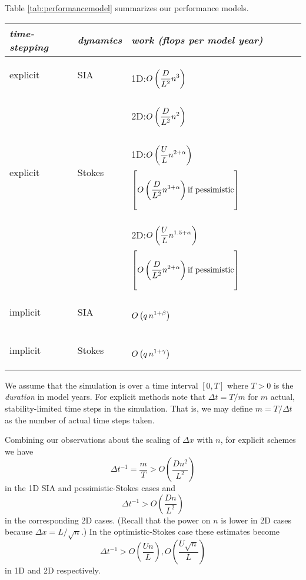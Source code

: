 \documentclass[twocolumn,letterpaper]{igs}
\begin{document}
Table \ref{tab:performancemodel} summarizes our performance models.

\newcommand{\oo}[1]{{\LARGE \strut} \displaystyle O\left(#1\right)}
\setlength{\tabcolsep}{5pt}
\renewcommand{\arraystretch}{1.5}
\begin{table*}[ht]
\begin{tabular}{lll}
\emph{time-stepping} & \emph{dynamics} & \emph{work (flops per model year)} \\ \hline
explicit & SIA    & 1D:\quad $\oo{\frac{D}{L^2} n^3}$ \\
         &        & 2D:\quad $\oo{\frac{D}{L^2} n^2}$ \\
explicit & Stokes & 1D:\quad $\oo{\frac{U}{L} n^{2+\alpha}}$ \quad $\left[\oo{\frac{D}{L^2} n^{3+\alpha}} \text{if pessimistic}\right]$ \\
         &        & 2D:\quad $\oo{\frac{U}{L} n^{1.5+\alpha}}$ \quad $\left[\oo{\frac{D}{L^2} n^{2+\alpha}} \text{if pessimistic}\right]$ \\
implicit & SIA    & $\oo{q\, n^{1+\beta}}$ \\
implicit & Stokes & $\oo{q\, n^{1+\gamma}}$
\end{tabular}
\caption{Asymptotic scaling of computational work for time-stepping numerical ice sheet simulations as the degrees of freedom $n$ goes to infinity (high horizontal resolution).  Note 1D and 2D refer to flow-line and map-plane simulations, respectively.  See Table \ref{tab:notation} for remaining notation.}
\label{tab:performancemodel}
\end{table*}

We assume that the simulation is over a time interval $[0,T]$ where $T>0$ is the \emph{duration} in model years.  For explicit methods note that $\Delta t = T/m$ for $m$ actual, stability-limited time steps in the simulation.  That is, we may define $m=T/\Delta t$ as the number of actual time steps taken.

Combining our observations about the scaling of $\Delta x$ with $n$, for explicit schemes we have
\begin{equation}
\Delta t^{-1} = \frac{m}{T} > O\left(\frac{D n^2}{L^2}\right)
\end{equation}
in the 1D SIA and pessimistic-Stokes cases and
\begin{equation}
\Delta t^{-1} > O\left(\frac{D n}{L^2}\right)
\end{equation}
in the corresponding 2D cases.  (Recall that the power on $n$ is lower in 2D cases because $\Delta x = L/\sqrt{n}$.)  In the optimistic-Stokes case these estimates become
\begin{equation}
\Delta t^{-1} > O\left(\frac{U n}{L}\right), O\left(\frac{U \sqrt{n}}{L}\right)
\end{equation}
in 1D and 2D respectively.
\end{document}
